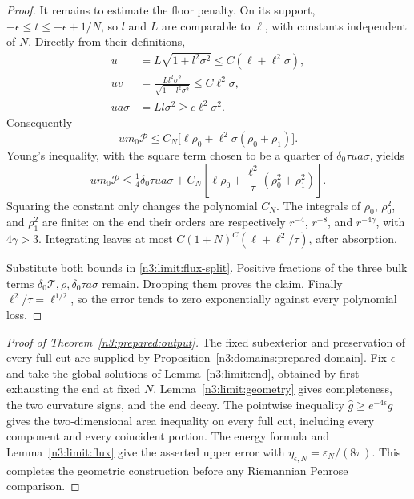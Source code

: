 \begin{proof}
It remains to estimate the floor penalty. On its support,
\(-\epsilon\le t\le-\epsilon+1/N\), so \(l\) and \(L\) are comparable
to \(\ell\), with constants independent of \(N\).
Directly from their definitions,
\[
 \begin{split}
 u&=L\sqrt{1+l^2\sigma^2}
                      \le C(\ell+\ell^2\sigma),\\
 uv&=\frac{Ll^2\sigma^2}{\sqrt{1+l^2\sigma^2}}
                      \le C\ell^2\sigma,\\
 ua\sigma&=Ll\sigma^2\ge c\ell^2\sigma^2 .
 \end{split}
\]
Consequently
\[
 um_0\mathcal P
 \le C_N\bigl[\ell\rho_0+\ell^2\sigma(\rho_0+\rho_1)\bigr].
\]
Young's inequality, with the square term chosen to be a quarter of
\(\delta_0\tau ua\sigma\), yields
\[
 um_0\mathcal P
 \le \tfrac14\delta_0\tau ua\sigma+
 C_N\left[\ell\rho_0+
              \frac{\ell^2}{\tau}(\rho_0^2+\rho_1^2)\right].
\]
Squaring the constant only changes the polynomial
\(C_N\). The integrals of \(\rho_0\), \(\rho_0^2\), and \(\rho_1^2\)
are finite: on the end their orders are respectively \(r^{-4}\),
\(r^{-8}\), and \(r^{-4\gamma}\), with \(4\gamma>3\).
Integrating leaves at most
\(C(1+N)^C(\ell+\ell^2/\tau)\), after absorption.

Substitute both bounds in \eqref{n3:limit:flux-split}.
Positive fractions of the three bulk terms
\(\delta_0\mathcal T,\rho,\delta_0\tau a\sigma\) remain.
Dropping them proves the claim. Finally
\(\ell^2/\tau=\ell^{1/2}\), so the error tends to zero
exponentially against every polynomial loss.
\end{proof}

\begin{proof}[Proof of Theorem~\ref{n3:prepared:output}]
The fixed subexterior and preservation of every full cut are supplied
by Proposition~\ref{n3:domains:prepared-domain}. Fix $\epsilon$ and
take the global solutions of Lemma~\ref{n3:limit:end}, obtained by
first exhausting the end at fixed $N$. Lemma~\ref{n3:limit:geometry}
gives completeness, the two curvature signs, and the end decay. The
pointwise inequality $\widehat g\ge e^{-4\epsilon}g$ gives the
two-dimensional area inequality on every full cut, including every
component and every coincident portion. The energy formula and
Lemma~\ref{n3:limit:flux} give the asserted upper error with
$\eta_{\epsilon,N}=\varepsilon_N/(8\pi)$. This completes the
geometric construction before any Riemannian Penrose comparison.
\end{proof}

